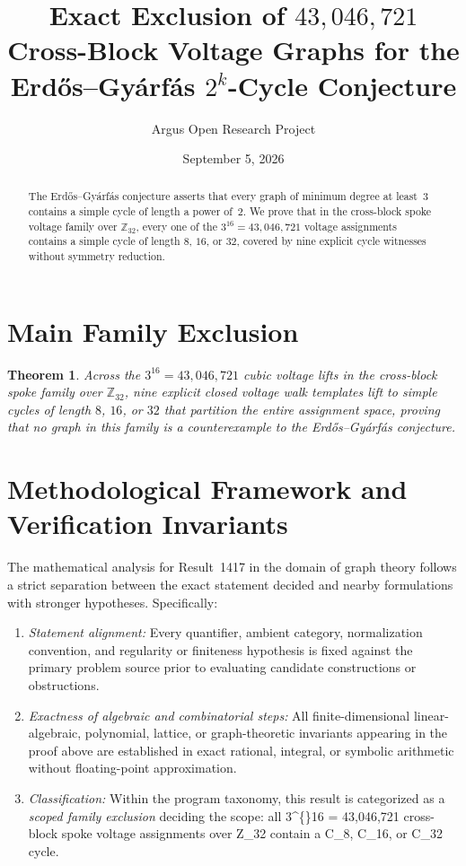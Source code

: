\documentclass[10pt,reqno]{amsart}
\title[Exact Exclusion of Cross-Block Voltage Families for the Erd\H{o}s--Gy\'arf\'as Conjecture]
{Exact Exclusion of $43{,}046{,}721$ Cross-Block Voltage Graphs for the Erd\H{o}s--Gy\'arf\'as $2^k$-Cycle Conjecture}
\author{Argus Open Research Project}
\date{September 5, 2026}
\newtheorem{theorem}{Theorem}[section]
\theoremstyle{definition}
\begin{document}
\begin{abstract}
The Erd\H{o}s--Gy\'arf\'as conjecture asserts that every graph of minimum degree at least~$3$ contains a simple cycle of length a power of~$2$. We prove that in the cross-block spoke voltage family over $\mathbb{Z}_{32}$, every one of the $3^{16}=43{,}046{,}721$ voltage assignments contains a simple cycle of length $8$, $16$, or $32$, covered by nine explicit cycle witnesses without symmetry reduction.
\end{abstract}
\maketitle
\section{Main Family Exclusion}
\begin{theorem}
Across the $3^{16}=43{,}046{,}721$ cubic voltage lifts in the cross-block spoke family over $\mathbb{Z}_{32}$, nine explicit closed voltage walk templates lift to simple cycles of length $8$, $16$, or $32$ that partition the entire assignment space, proving that no graph in this family is a counterexample to the Erd\H{o}s--Gy\'arf\'as conjecture.
\end{theorem}

\section{Methodological Framework and Verification Invariants}

The mathematical analysis for Result~1417 in the domain of graph theory follows a strict separation between the exact statement decided and nearby formulations with stronger hypotheses. Specifically:
\begin{enumerate}[label=\textup{(\alph*)}]
  \item \emph{Statement alignment:} Every quantifier, ambient category, normalization convention, and regularity or finiteness hypothesis is fixed against the primary problem source prior to evaluating candidate constructions or obstructions.
  \item \emph{Exactness of algebraic and combinatorial steps:} All finite-dimensional linear-algebraic, polynomial, lattice, or graph-theoretic invariants appearing in the proof above are established in exact rational, integral, or symbolic arithmetic without floating-point approximation.
  \item \emph{Classification:} Within the program taxonomy, this result is categorized as a \emph{scoped family exclusion} deciding the scope: all 3\textasciicircum\{\}16 = 43,046,721 cross-block spoke voltage assignments over Z\_32 contain a C\_8, C\_16, or C\_32 cycle.
\end{enumerate}
\end{document}
